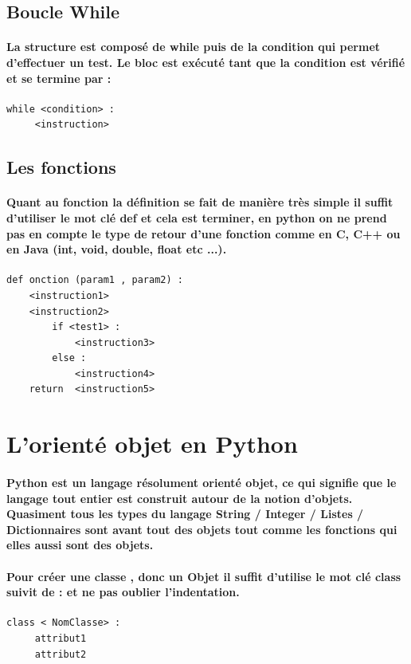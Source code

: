 \documentclass[a4paper, 12pt, twoside]{article}
\begin{document}
\subsection{ Boucle While }
\paragraph{La structure est composé de while puis de la condition qui permet d'effectuer un test. Le bloc est exécuté tant que la condition est vérifié et se termine par  : }
\begin{verbatim}
while <condition> :
     <instruction>
\end{verbatim}
\subsection{ Les fonctions}
\paragraph{Quant au fonction la définition se fait de manière très simple il suffit d'utiliser le mot clé def et cela est terminer, en python on ne prend pas en compte le type de retour d'une fonction comme en C, C++ ou en Java (int, void, double, float etc ...).}
\begin{verbatim}
def onction (param1 , param2) :
    <instruction1>
    <instruction2>
        if <test1> :
            <instruction3>
        else :
            <instruction4>
    return  <instruction5>
\end{verbatim}

\section{L'orienté objet en Python}
\paragraph{ Python est un langage résolument orienté objet, ce qui signifie que le langage tout entier est construit autour de la notion d’objets. Quasiment tous les types du langage String / Integer / Listes / Dictionnaires  sont avant tout des objets tout comme les fonctions
qui elles aussi sont des objets.}

\paragraph{ Pour créer une classe , donc un Objet il suffit d'utilise le mot clé class suivit de  :  et ne pas oublier l'indentation.}
\begin{verbatim}
class < NomClasse> : 
     attribut1
     attribut2 
\end{verbatim}
\end{document}
